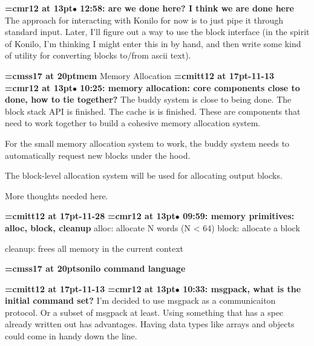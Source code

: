 {\smallskip\noindent\bf\font\titlefont=cmr12 at 13pt\titlefont $\bullet$ 12:58: are we done here? I think we are done here}\smallskip
The approach for interacting with Konilo for now is to just pipe it through standard input. Later, I'll figure out a way to use the block interface (in the spirit of Konilo, I'm thinking I might enter this in by hand, and then write some kind of utility for converting blocks to/from ascii text).
\par

{\medskip\noindent\bf\font\titlefont=cmss17 at 20pt\titlefont mem}\medskip
Memory Allocation
{\medskip\noindent\bf\font\titlefont=cmitt12 at 17pt-11-13}\medskip
{\smallskip\noindent\bf\font\titlefont=cmr12 at 13pt\titlefont $\bullet$ 10:25: memory allocation: core components close to done, how to tie together?}\smallskip
The buddy system is close to being done. The block stack API is finished. The cache is is finished. These are components that need to work together to build a cohesive memory allocation system.
\par

For the small memory allocation system to work, the buddy system needs to automatically request new blocks under the hood.
\par

The block-level allocation system will be used for allocating output blocks.
\par

More thoughts needed here.
\par

{\medskip\noindent\bf\font\titlefont=cmitt12 at 17pt-11-28}\medskip
{\smallskip\noindent\bf\font\titlefont=cmr12 at 13pt\titlefont $\bullet$ 09:59: memory primitives: alloc, block, cleanup}\smallskip
alloc: allocate N words (N < 64) block: allocate a block
\par

cleanup: frees all memory in the current context
\par

{\medskip\noindent\bf\font\titlefont=cmss17 at 20pt\titlefont sonilo command language}\medskip

{\medskip\noindent\bf\font\titlefont=cmitt12 at 17pt-11-13}\medskip
{\smallskip\noindent\bf\font\titlefont=cmr12 at 13pt\titlefont $\bullet$ 10:33: msgpack, what is the initial command set?}\smallskip
I'm decided to use msgpack as a communicaiton protocol. Or a subset of msgpack at least. Using something that has a spec already written out has advantages. Having data types like arrays and objects could come in handy down the line.
\par

